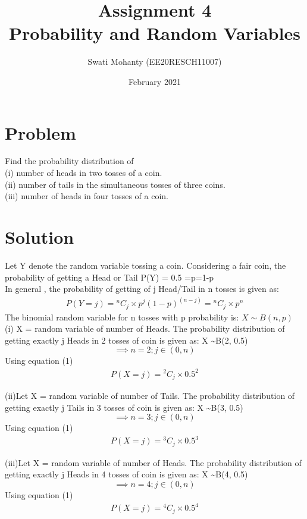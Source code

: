 \documentclass[journal,12pt,twocolumn]{IEEEtran}
\title{Assignment 4
\\Probability and Random Variables }
\author{Swati Mohanty (EE20RESCH11007) }
\date{February 2021}
\newcommand*{\Comb}[2]{{}^{#1}C_{#2}}%
\begin{document}
\maketitle


\section{Problem}
Find the probability distribution of
\\(i) number of heads in two tosses of a coin.
\\(ii) number of tails in the simultaneous tosses
of three coins.
\\(iii) number of heads in four tosses of a coin.

\section{Solution}
Let Y denote the random variable tossing a coin. Considering a fair coin, the probability of getting a Head or Tail P(Y) = 0.5 =p=1-p
\\In general , the probability of getting of j Head/Tail in n tosses is given as:
\begin{align}
    P(Y = j) = \Comb{n}{j}\times { p^j (1-p)^{(n-j)}} = \Comb{n}{j}\times { p^n } 
\end{align}
The binomial random variable for n tosses with p probability is:
$X \sim B(n, p) $
\\(i)
 X = random variable of number of Heads.
The probability distribution of getting exactly j Heads in 2 tosses of coin is given as: X \sim B(2, 0.5)
 \[\implies n=2; j \in (0,n)\]
Using equation (1)
\begin{align}
    P(X = j)  =\Comb{2}{j}\times { 0.5^2}
\end{align}



(ii)Let X = random variable of number of Tails.
The probability distribution of getting exactly j Tails in 3 tosses of coin is given as: X \sim B(3, 0.5) 
\[\implies n=3; j \in (0,n)\]
Using equation (1)
\begin{align}
    P(X = j)  =\Comb{3}{j}\times { 0.5^3}
\end{align}


(iii)Let X = random variable of number of Heads.
The probability distribution of getting exactly j Heads in 4 tosses of coin is given as:  X \sim B(4, 0.5) 
\[\implies n=4; j \in (0,n)\]
Using equation (1)
\begin{align}
    P(X = j)  =\Comb{4}{j}\times { 0.5^4}
\end{align}
\end{document}
